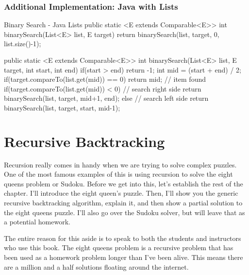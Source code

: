 \subsubsection{Additional Implementation: Java with Lists}


\begin{javacode}[listing and comment,  comment={Performing binary search on a list looks something like this.  Recall that \texttt{Comparable} is an interface that Java uses to let methods and classes know something can be put in order\footnote{Formally, this is a  \textit{total ordering} in fancy math lingo, which means any two items have an established order}.  This necessarily  means that they can be sorted. The generic \texttt{<E extends Comparable<E>>} means the the \texttt{List} of \texttt{E}'s is guaranteed to be made up of items that can be compared to other things of type \texttt{E} to see which comes first.}]{Binary Search - Java Lists}
public static <E extends Comparable<E>> int binarySearch(List<E> list, E target) {
	return binarySearch(list, target, 0, list.size()-1);
}

public static <E extends Comparable<E>> int binarySearch(List<E> list, E target, int start, int end) {
	if(start > end) {
		return -1;
	}
	int mid = (start + end) / 2;
	if(target.compareTo(list.get(mid)) == 0) {
		return mid; // item found
	}
	if(target.compareTo(list.get(mid)) < 0) {
		// search right side
		return binarySearch(list, target, mid+1, end);
	} else {
		// search left side
		return binarySearch(list, target, start, mid-1);
	}
}

\end{javacode}

\section{Recursive Backtracking}
Recursion really comes in handy when we are trying to solve complex puzzles.
One of the most famous examples of this is using recursion to solve the eight queens problem or Sudoku.  Before we get into this, let's establish the rest of the chapter. I'll introduce the eight queen's puzzle.  Then, I'll show you the generic recursive backtracking algorithm, explain it, and then show a partial solution to the eight queens puzzle.  I'll also go over the Sudoku solver, but will leave that as a potential homework.


The entire reason for this aside is to speak to both the students and instructors who use this book.  The eight queens problem is a recursive problem that has been used as a homework problem longer than I've been alive.  This means there are a million and a half solutions floating around the internet.  

